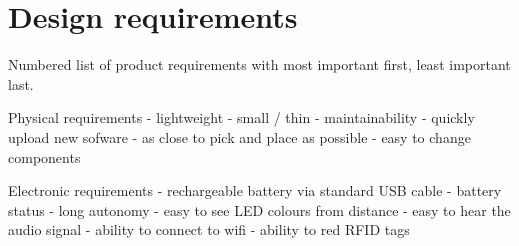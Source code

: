 \section{Design requirements}

Numbered list of product requirements with most important first, least important last.

Physical requirements
- lightweight
- small / thin
- maintainability 
	- quickly upload new sofware
	- as close to pick and place as possible
	- easy to change components

Electronic requirements
- rechargeable battery via standard USB cable
- battery status
- long autonomy 
- easy to see LED colours from distance
- easy to hear the audio signal
- ability to connect to wifi
- ability to red RFID tags